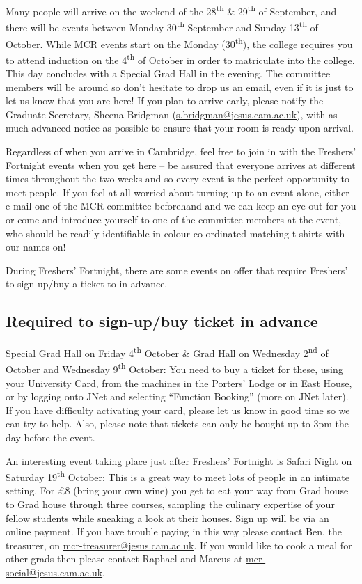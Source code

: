 \documentclass[11pt,fleqn, oneside]{book} %
\begin{document}
Many people will arrive on the weekend of the 28\textsuperscript{th} \& 29\textsuperscript{th} of September, and there will be events between Monday 30\textsuperscript{th} September and Sunday 13\textsuperscript{th} of October.  While MCR events start on the Monday (30\textsuperscript{th}), the college requires you to attend induction on the 4\textsuperscript{th} of October in order to matriculate into the college. This day concludes with a Special Grad Hall in the evening.  The committee members will be around so don’t hesitate to drop us an email, even if it is just to let us know that you are here!  If you plan to arrive early, please notify the Graduate Secretary, Sheena Bridgman (\url{s.bridgman@jesus.cam.ac.uk}), with as much advanced notice as possible to ensure that your room is ready upon arrival.

Regardless of when you arrive in Cambridge, feel free to join in with the Freshers’ Fortnight events when you get here – be assured that everyone arrives at different times throughout the two weeks and so every event is the perfect opportunity to meet people.  If you feel at all worried about turning up to an event alone, either e-mail one of the MCR committee beforehand and we can keep an eye out for you or come and introduce yourself to one of the committee members at the event, who should be  readily identifiable in colour co-ordinated matching t-shirts with our names on! 

During Freshers’ Fortnight, there are some events on offer that require Freshers’ to sign up/buy a ticket to in advance.

\subsection{Required to sign-up/buy ticket in advance}

Special Grad Hall on Friday 4\textsuperscript{th} October \& Grad Hall on Wednesday 2\textsuperscript{nd} of October and Wednesday 9\textsuperscript{th} October: You need to buy a ticket for these, using your University Card, from the machines in the Porters' Lodge or in East House, or by logging onto JNet and selecting ``Function Booking'' (more on JNet later).  If you have difficulty activating your card, please let us know in good time so we can try to help.   Also, please note that tickets can only be bought up to 3pm the day before the event.

An interesting event taking place just after Freshers’ Fortnight is Safari Night on Saturday 19\textsuperscript{th} October:  This is a great way to meet lots of people in an intimate setting. For \pounds{8} (bring your own wine) you get to eat your way from Grad house to Grad house through three courses, sampling the culinary expertise of your fellow students while sneaking a look at their houses. Sign up will be via an online payment. If you have trouble paying in this way please contact Ben, the treasurer, on \url{mcr-treasurer@jesus.cam.ac.uk}. If you would like to cook a meal for other grads then please contact Raphael and Marcus at \url{mcr-social@jesus.cam.ac.uk}.
\end{document}
